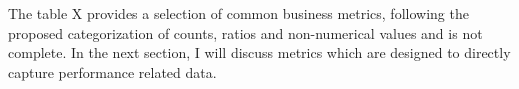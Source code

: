 












The table X provides a selection of common business metrics, following the proposed categorization of counts, ratios and non-numerical values and is not complete.
In the next section, I will discuss metrics which are designed to directly capture performance related data.







 
 



